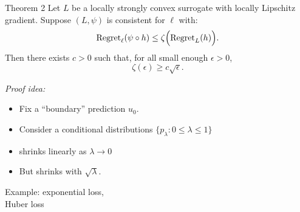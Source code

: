 \documentclass[t,mathserif,11pt,aspectratio=1610,handout]{beamer}
\begin{document}
\begin{frame}
  \begin{block}{Theorem 2}
    Let $L$ be a locally strongly convex surrogate with locally Lipschitz gradient.
    Suppose $(L,\psi)$ is consistent for $\ell$ with:
    \[  \mathrm{Regret}_{\ell}(\psi \circ h) \leq \zeta\Big( \mathrm{Regret}_L(h) \Big) . \]
   Then there exists $c > 0$ such that, for all small enough $\epsilon > 0$,
    \[ \zeta(\epsilon) \geq c \sqrt{\epsilon} . \]
  \end{block}

  \pause
  \emph{Proof idea:}
  \begin{itemize}
    \item Fix a ``boundary'' prediction $u_0$.
    \item Consider a conditional distributions $\{p_{\lambda} : 0 \leq \lambda \leq 1\}$
    \item {} shrinks linearly as $\lambda \to 0$
    \item But  shrinks with $\sqrt{\lambda}$.
  \end{itemize}

  \pause
  Example: exponential loss,    \\
  Huber loss                  
\end{frame}


\end{document}
